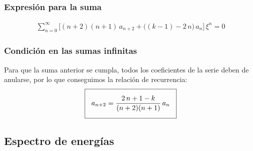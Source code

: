 \documentclass[12pt]{beamer}
\begin{document}
\begin{frame}
\frametitle{Expresión para la suma}
\begin{align*}
\sum_{n=0}^{\infty} \bigg[ (n {+} 2)(n {+} 1) \, a_{n+2} + \big( (k {-} 1) {-} 2 \, n \big) \,a_{n} \bigg] \, \xi^{n} = 0
\end{align*}    
\end{frame}
\begin{frame}
\frametitle{Condición en las sumas infinitas}
Para que la suma anterior se cumpla, todos los coeficientes de la serie deben de anularse, \pause por lo que conseguimos la relación de recurrencia:
\begin{align*}
\setlength{\fboxsep}{3\fboxsep}\boxed{
a_{n+2} = \dfrac{2 \, n + 1 - k}{(n + 2)(n + 1)} \, a_{n} }
\end{align*}
\end{frame}

\subsection{Espectro de energías}
\end{document}
